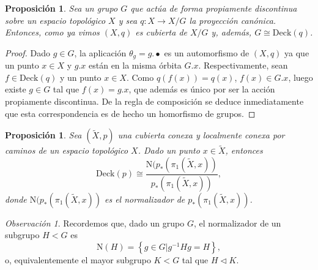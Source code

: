 \documentclass[12pt,a4paper]{book}
\newtheorem{prop}[thm]{Proposición}
\theoremstyle{definition} \newtheorem{defn}[thm]{Definición}
\theoremstyle{definition} \newtheorem{ejemplo}[thm]{Ejemplo}
\theoremstyle{definition} \newtheorem{ejercicio}[thm]{Ejercicio}
\theoremstyle{remark} \newtheorem*{obs}{Observación}
\def\gf{\pi_1}
\def\XX{\tilde{X}}
\def\DD{\mathrm{Deck}}
\def\NN{\mathrm{N}}
\begin{document}
\begin{prop}
  Sea un grupo $G$ que actúa de forma propiamente discontinua sobre un espacio topológico $X$ y sea $q:X\rightarrow X/G$ la proyección canónica. Entonces, como ya vimos $(X,q)$ es cubierta de $X/G$ y, además, $G\cong \DD(q)$.
\end{prop}
\begin{proof}
  Dado $g\in G$, la aplicación $\theta_g=g.\bullet$ es un automorfismo de $(X,q)$ ya que un punto $x\in X$ y $g.x$ están en la misma órbita $G.x$. Respectivamente, sean $f\in \DD(q)$ y un punto $x\in X$. Como $q(f(x))=q(x)$, $f(x)\in G.x$, luego existe $g\in G$ tal que $f(x)=g.x$, que además es único por ser la acción propiamente discontinua. De la regla de composición se deduce inmediatamente que esta correspondencia es de hecho un homorfismo de grupos.
\end{proof}

\begin{prop}
  Sea $(\XX,p)$ una cubierta conexa y localmente conexa por caminos de un espacio topológico $X$. Dado un punto $x\in \XX$, entonces
  \begin{equation*}
    \DD(p)\cong \frac{\NN(p_*(\gf(\XX,x))}{p_*(\gf(\XX,x))},
  \end{equation*}
  donde $\NN(p_*(\gf(\XX,x))$ es el normalizador de $p_*(\gf(\XX,x))$.
\end{prop}
\begin{obs}
  Recordemos que, dado un grupo $G$, el normalizador de un subgrupo $H<G$ es 
  \begin{equation*}
    \NN(H)=\left\{ g\in G| g^{-1}Hg=H \right\},
  \end{equation*}
  o, equivalentemente el mayor subgrupo $K<G$ tal que $H\lhd K$.
\end{obs}
\end{document}
